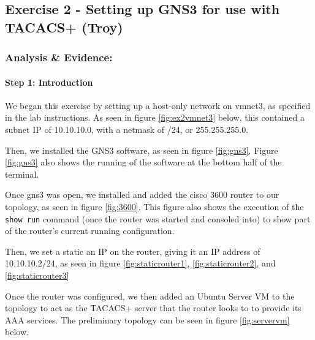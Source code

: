 \documentclass[main.tex]{subfiles}
\begin{document}
\subsection{Exercise 2 - Setting up GNS3 for use with TACACS+ (Troy)}

\subsubsection{Analysis \& Evidence:}

\paragraph{Step 1: Introduction}
\hfill \break

We began this exercise by setting up a host-only network on vmnet3, as specified in the lab instructions. As seen in figure \ref{fig:ex2vmnet3} below, this contained a subnet IP of 10.10.10.0, with a netmask of /24, or 255.255.255.0.


Then, we installed the GNS3 software, as seen in figure \ref{fig:gns3}. Figure \ref{fig:gns3} also shows the running of the software at the bottom half of the terminal.


Once gns3 was open, we installed and added the cisco 3600 router to our topology, as seen in figure \ref{fig:3600}. This figure also shows the execution of the \texttt{show run} command (once the router was started and consoled into) to show part of the router's current running configuration.

Then, we set a static an IP on the router, giving it an IP address of 10.10.10.2/24, as seen in figure \ref{fig:staticrouter1}, \ref{fig:staticrouter2}, and \ref{fig:staticrouter3}



Once the router was configured, we then added an Ubuntu Server VM to the topology to act as the TACACS+ server that the router looks to to provide its AAA services. The preliminary topology can be seen in figure \ref{fig:servervm} below.
\end{document}
